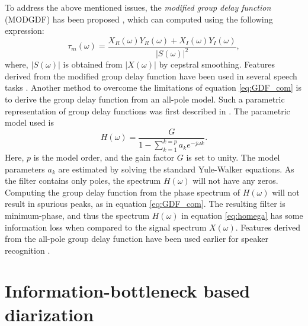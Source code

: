 \documentclass[conference]{IEEEtran}
\begin{document}
To address the above mentioned issues, the
\textit{modified group delay function} (MODGDF) has been proposed
\cite{modifiedGD}, which can
computed using the following expression:
\begin{equation}
\tau_{m}(\omega) =  
\frac{X_R(\omega)Y_R(\omega) + X_I(\omega)Y_I(\omega)}{|S(\omega)|^2}, 
\label{eq:MODGDF}
\end{equation}
where, $|S(\omega)|$ is obtained from $|X(\omega)|$ by cepstral smoothing.
Features derived from the modified group delay function have been used in
several speech tasks \cite{modifiedGD}.
Another method to overcome the limitations of equation \ref{eq:GDF_com} is to
derive the group delay function from an all-pole model. Such a parametric
representation of group delay functions was first described in \cite{yegnaJASA}.
The parametric model used is
\begin{equation}
H(\omega) =  \frac{G}{1 - \sum_{k=1}^{k = p} a_k e^{-j\omega k}}.
\label{eq:homega}
\end{equation}
Here, $p$ is the model order, and the gain factor $G$ is set to unity. The model
parameters $a_k$ are estimated by solving the standard Yule-Walker equations. As
the filter contains only poles, the spectrum $H(\omega)$ will not have any
zeros.  Computing the group delay function from the phase spectrum of
$H(\omega)$ will not result in spurious peaks, as in equation \ref{eq:GDF_com}.
The resulting filter is minimum-phase, and thus the spectrum $H(\omega)$ in
equation \ref{eq:homega} has some information loss when compared to the signal
spectrum $X(\omega)$. Features derived from the all-pole group delay function
have been used earlier for speaker recognition \cite{allPoleGdSid}.

\section{Information-bottleneck based diarization}
\label{system}

\end{document}
